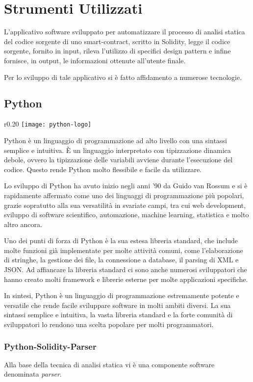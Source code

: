 \chapter{Strumenti Utilizzati}
L'applicativo software sviluppato per automatizzare il processo di analisi statica del codice sorgente di uno smart-contract, scritto in Solidity, legge il codice sorgente, fornito in input, rileva l'utilizzo di specifici design pattern e infine fornisce, in output, le informazioni ottenute all'utente finale.\par
Per lo sviluppo di tale applicativo si è fatto affidamento a numerose tecnologie.

\section{Python}

\begin{wrapfigure}{r}{0.20\textwidth}
	\centering
	\texttt{[image: python-logo]}
\end{wrapfigure}
Python\cite{python} è un linguaggio di programmazione ad alto livello con una sintassi semplice e intuitiva. È un linguaggio interpretato con tipizzazione dinamica debole, ovvero la tipizzazione delle variabili avviene durante l'esecuzione del codice. Questo rende Python molto flessibile e facile da utilizzare.\par
Lo sviluppo di Python ha avuto inizio negli anni '90 da Guido van Rossum e si è rapidamente affermato come uno dei linguaggi di programmazione più popolari, grazie sopratutto alla sua versatilità in svariate campi, tra cui web development, sviluppo di software scientifico, automazione, machine learning, statistica e molto altro ancora.\par
Uno dei punti di forza di Python è la sua estesa libreria standard, che include molte funzioni già implementate per molte attività comuni, come l'elaborazione di stringhe, la gestione dei file, la connessione a database, il parsing di XML e JSON. Ad affiancare la libreria standard ci sono anche numerosi sviluppatori che hanno creato molti framework e librerie esterne per molte applicazioni specifiche.\par
In sintesi, Python è un linguaggio di programmazione estremamente potente e versatile che rende facile sviluppare software in molti ambiti diversi. La sua sintassi semplice e intuitiva, la vasta libreria standard e la forte comunità di sviluppatori lo rendono una scelta popolare per molti programmatori.

\subsection{Python-Solidity-Parser}
Alla base della tecnica di analisi statica vi è una componente software denominata \textit{parser}. 